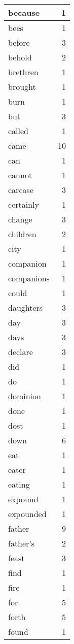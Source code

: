 \begin{center}
\begin{longtable}{l|r}
because & 1\\ \hline 
bees & 1\\ \hline 
before & 3\\ \hline 
behold & 2\\ \hline 
brethren & 1\\ \hline 
brought & 1\\ \hline 
burn & 1\\ \hline 
but & 3\\ \hline 
called & 1\\ \hline 
came & 10\\ \hline 
can & 1\\ \hline 
cannot & 1\\ \hline 
carcase & 3\\ \hline 
certainly & 1\\ \hline 
change & 3\\ \hline 
children & 2\\ \hline 
city & 1\\ \hline 
companion & 1\\ \hline 
companions & 1\\ \hline 
could & 1\\ \hline 
daughters & 3\\ \hline 
day & 3\\ \hline 
days & 3\\ \hline 
declare & 3\\ \hline 
did & 1\\ \hline 
do & 1\\ \hline 
dominion & 1\\ \hline 
done & 1\\ \hline 
dost & 1\\ \hline 
down & 6\\ \hline 
eat & 1\\ \hline 
eater & 1\\ \hline 
eating & 1\\ \hline 
expound & 1\\ \hline 
expounded & 1\\ \hline 
father & 9\\ \hline 
father's & 2\\ \hline 
feast & 3\\ \hline 
find & 1\\ \hline 
fire & 1\\ \hline 
for & 5\\ \hline 
forth & 5\\ \hline 
found & 1\\ \hline 

\end{longtable}
\end{center}
